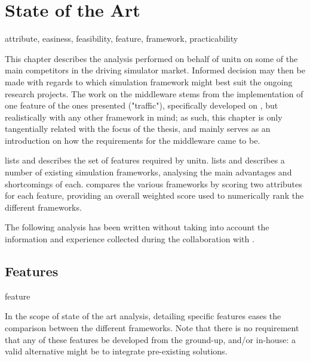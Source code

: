 \chapter{State of the Art}\label{ch:stateoftheart} %

\begin{keywords}
	attribute, easiness, feasibility, feature, framework, practicability
\end{keywords}

This chapter describes the analysis performed on behalf of \gls{unitn} on some of the main competitors in the driving simulator market. Informed decision may then be made with regards to which simulation \gls{framework} might best suit the ongoing research projects. The work on the \gls{middleware} stems from the implementation of one feature of the ones presented ("traffic"), specifically developed on , but realistically with any other \gls{framework} in mind; as such, this chapter is only tangentially related with the focus of the thesis, and mainly serves as an introduction on how the requirements for the \gls{middleware} came to be.

 lists and describes the set of \glspl{feature} required by \gls{unitn}.  lists and describes a number of existing simulation \glspl{framework}, analysing the main advantages and shortcomings of each.  compares the various \glspl{framework} by scoring two \glspl{attribute} for each \gls{feature}, providing an overall weighted score used to numerically rank the different \glspl{framework}.

The following analysis has been written without taking into account the information and experience collected during the collaboration with .

\section{Features}\label{sc:stateoftheart:features}

\begin{definition}{feature}
\end{definition}

In the scope of state of the art analysis, detailing specific \glspl{feature} eases the comparison between the different \glspl{framework}. Note that there is no requirement that any of these \glspl{feature} be developed from the ground-up, and/or in-house: a valid alternative might be to integrate pre-existing solutions.

